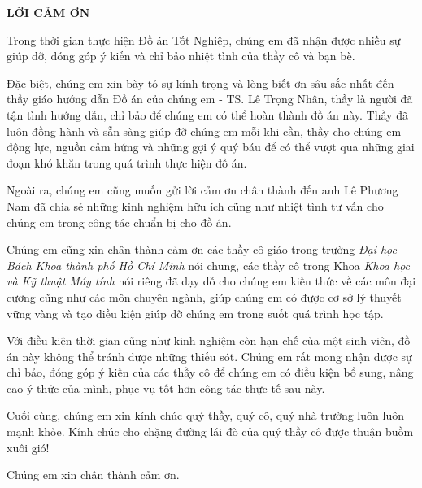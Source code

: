 \vspace*{1.5cm}
\begin{center}
    \textbf{LỜI CẢM ƠN}
\end{center}

Trong thời gian thực hiện Đồ án Tốt Nghiệp, chúng em đã nhận được nhiều sự giúp đỡ, đóng góp ý kiến và chỉ bảo nhiệt tình của thầy cô và bạn bè.

Đặc biệt, chúng em xin bày tỏ sự kính trọng và lòng biết ơn sâu sắc nhất đến thầy giáo hướng dẫn Đồ án của chúng em - TS. Lê Trọng Nhân, thầy là người đã tận tình hướng dẫn, chỉ bảo để chúng em có thể hoàn thành đồ án này. Thầy đã luôn đồng hành và sẵn sàng giúp đỡ chúng em mỗi khi cần, thầy cho chúng em động lực, nguồn cảm hứng và những gợi ý quý báu để có thể vượt qua những giai đoạn khó khăn trong quá trình thực hiện đồ án.

Ngoài ra, chúng em cũng muốn gửi lời cảm ơn chân thành đến anh Lê Phương Nam đã chia sẻ những kinh nghiệm hữu ích cũng như nhiệt tình tư vấn cho chúng em trong công tác chuẩn bị cho đồ án.

Chúng em cũng xin chân thành cảm ơn các thầy cô giáo trong trường \textit{Đại học Bách Khoa thành phố Hồ Chí Minh} nói chung, các thầy cô trong Khoa \textit{Khoa học và Kỹ thuật Máy tính} nói riêng đã dạy dỗ cho chúng em kiến thức về các môn đại cương cũng như các môn chuyên ngành, giúp chúng em có được cơ sở lý thuyết vững vàng và tạo điều kiện giúp đỡ chúng em trong suốt quá trình học tập.

Với điều kiện thời gian cũng như kinh nghiệm còn hạn chế của một sinh viên, đồ án này không thể tránh được những thiếu sót. Chúng em rất mong nhận được sự chỉ bảo, đóng góp ý kiến của các thầy cô để chúng em có điều kiện bổ sung, nâng cao ý thức của mình, phục vụ tốt hơn công tác thực tế sau này.

Cuối cùng, chúng em xin kính chúc quý thầy, quý cô, quý nhà trường luôn luôn mạnh khỏe. Kính chúc cho chặng đường lái đò của quý thầy cô được thuận buồm xuôi gió!

Chúng em xin chân thành cảm ơn.



